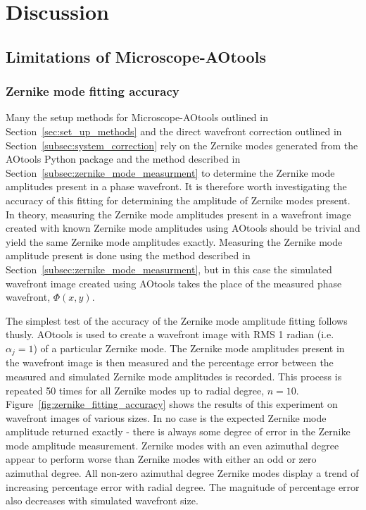 \chapter{Discussion}

\section{Limitations of Microscope-AOtools}
\label{sec:limitations}

\subsection{Zernike mode fitting accuracy}
\label{subsec:zernike_accuracy}

Many the setup methods for Microscope-AOtools outlined in 
Section~\ref{sec:set_up_methods} and the direct wavefront correction 
outlined in Section~\ref{subsec:system_correction} rely on the Zernike 
modes generated from the AOtools Python package and the method 
described in Section~\ref{subsec:zernike_mode_measurment} to determine the 
Zernike mode amplitudes present in a phase 
wavefront\cite{townson2019aotools}. It is therefore worth investigating the 
accuracy of this fitting for determining the amplitude of Zernike modes 
present. In theory, measuring the Zernike mode amplitudes present in a 
wavefront image created with known Zernike mode amplitudes using AOtools 
should be trivial and yield the same Zernike mode amplitudes exactly. 
Measuring the Zernike mode amplitude present is done using the method 
described in Section~\ref{subsec:zernike_mode_measurment}, but in this case 
the simulated wavefront image created using AOtools takes the place of the 
measured phase wavefront, $\Phi(x,y)$. 

The simplest test of the accuracy of the Zernike mode amplitude fitting 
follows thusly. AOtools is used to create a wavefront image with RMS 1 radian 
(i.e. $\alpha_{j} = 1$) of a particular Zernike mode. The Zernike mode 
amplitudes present in the wavefront image is then measured and the percentage 
error between the measured and simulated Zernike mode amplitudes is recorded. 
This process is repeated 50 times for all Zernike modes up to radial degree, 
$n = 10$. Figure~\ref{fig:zernike_fitting_accuracy} shows the results of this 
experiment on wavefront images of various sizes. In no case is the expected 
Zernike mode amplitude returned exactly - there is always some degree of 
error in the Zernike mode amplitude measurement. Zernike modes with an even 
azimuthal degree appear to perform worse than Zernike modes with either an 
odd or zero azimuthal degree. All non-zero azimuthal degree Zernike modes 
display a trend of increasing percentage error with radial degree. The 
magnitude of percentage error also decreases with simulated wavefront size. 

